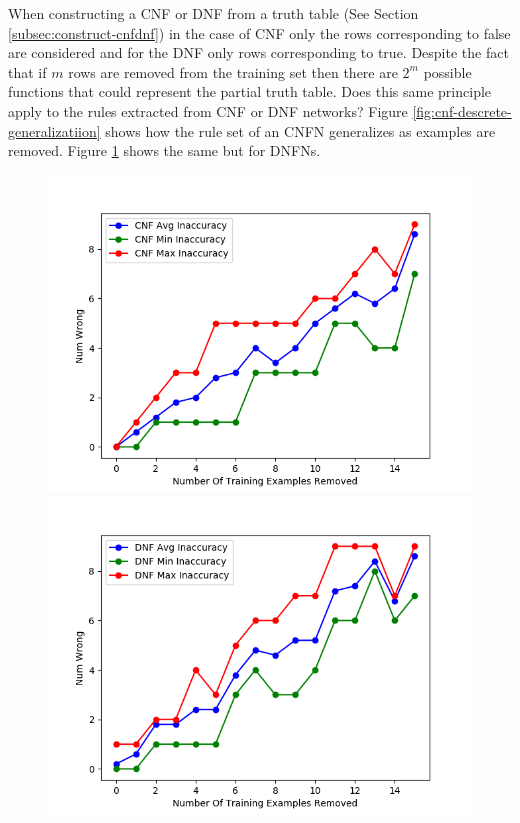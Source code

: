 When constructing a CNF or DNF from a truth table (See Section \ref{subsec:construct-cnfdnf}) in the case of CNF only the rows corresponding to false are considered and for the DNF only rows corresponding to true. Despite the fact that if $m$ rows are removed from the training set then there are $2^m$ possible functions that could represent the partial truth table. Does this same principle apply to the rules extracted from CNF or DNF networks? Figure \ref{fig:cnf-descrete-generalizatiion} shows how the rule set of an CNFN generalizes as examples are removed. Figure \ref{fig:dnf-descrete-generalizatiion} shows the same but for DNFNs.

\begin{figure}[H]
	\centering
	\begin{minipage}[b]{0.45\textwidth}
		\includegraphics[width=\textwidth]{cnf-descrete-generalization.png}
		\caption{}
		\label{fig:cnf-descrete-generalizatiion}
	\end{minipage}
	\begin{minipage}[b]{0.45\textwidth}
		\includegraphics[width=\textwidth]{dnf-descrete-generalization.png}
		\caption{}
		\label{fig:dnf-descrete-generalizatiion}
	\end{minipage}
	\hfill
\end{figure}

